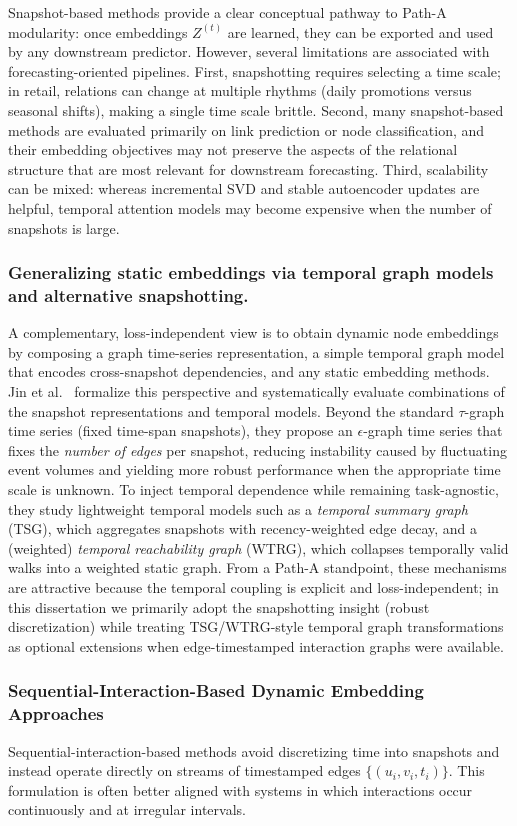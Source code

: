 Snapshot-based methods provide a clear conceptual pathway to Path-A modularity: once embeddings $Z^{(t)}$ are learned, they can be exported and used by any downstream predictor. However, several limitations are associated with forecasting-oriented pipelines. First, snapshotting requires selecting a time scale; in retail, relations can change at multiple rhythms (daily promotions versus seasonal shifts), making a single time scale brittle. Second, many snapshot-based methods are evaluated primarily on link prediction or node classification, and their embedding objectives may not preserve the aspects of the relational structure that are most relevant for downstream forecasting. Third, scalability can be mixed: whereas incremental SVD and stable autoencoder updates are helpful, temporal attention models may become expensive when the number of snapshots is large.
\subsubsection{Generalizing static embeddings via temporal graph models and alternative snapshotting.}
A complementary, loss-independent view is to obtain dynamic node embeddings by composing a graph time-series representation, a simple temporal graph model that encodes cross-snapshot
dependencies, and any static embedding methods.
Jin et al.~\cite{jin2022generalizing} formalize this perspective and systematically evaluate combinations
of the snapshot representations and temporal models. Beyond the standard $\tau$-graph time series
(fixed time-span snapshots), they propose an $\epsilon$-graph time series that fixes the \emph{number of edges}
per snapshot, reducing instability caused by fluctuating event volumes and yielding more robust
performance when the appropriate time scale is unknown.
To inject temporal dependence while remaining task-agnostic, they study lightweight temporal models such as
a \emph{temporal summary graph} (TSG), which aggregates snapshots with recency-weighted edge decay, and a
(weighted) \emph{temporal reachability graph} (WTRG), which collapses temporally valid walks into a weighted
static graph.
From a Path-A standpoint, these mechanisms are attractive because the temporal coupling is explicit and
loss-independent; in this dissertation we primarily adopt the snapshotting insight (robust discretization)
while treating TSG/WTRG-style temporal graph transformations as optional extensions when edge-timestamped
interaction graphs were available.

\subsubsection{Sequential-Interaction-Based Dynamic Embedding Approaches}
Sequential-interaction-based methods avoid discretizing time into snapshots and instead operate directly on streams of timestamped edges $\{(u_i,v_i,t_i)\}$. This formulation is often better aligned with systems in which interactions occur continuously and at irregular intervals.


